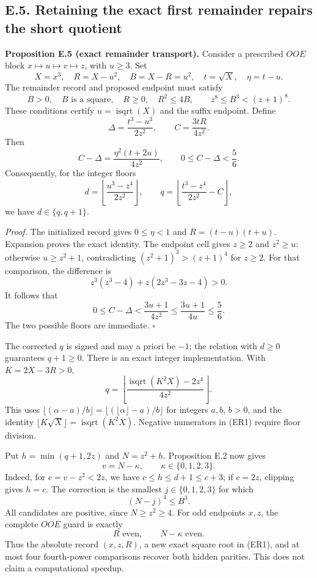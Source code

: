 \documentclass[12pt]{article}
\begin{document}
\subsection{E.5. Retaining the exact first remainder repairs the short
quotient}\label{e.5.-retaining-the-exact-first-remainder-repairs-the-short-quotient}

\textbf{Proposition E.5 (exact remainder transport).} Consider a
prescribed \(OOE\) block \(x\mapsto u\mapsto v\mapsto z\), with
\(u\ge3\). Set \[
X=x^3,\quad R=X-u^2,\quad B=X-R=u^2,\quad t=\sqrt X,\quad\eta=t-u.
\] The remainder record and proposed endpoint must satisfy \[
B>0,\quad B\text{ is a square},\quad R\ge0,\quad R^2\le4B,\qquad
z^8\le B^3<(z+1)^8.
\] These conditions certify \(u=\operatorname{isqrt}(X)\) and the suffix
endpoint. Define \[
\Delta=\frac{t^3-u^3}{2z^2},\qquad C=\frac{3tR}{4z^2}.
\] Then \[
C-\Delta=\frac{\eta^2(t+2u)}{4z^2},\qquad
0\le C-\Delta<\frac56.
\] Consequently, for the integer floors \[
d=\left\lfloor\frac{u^3-z^4}{2z^2}\right\rfloor,\qquad
q=\left\lfloor\frac{t^3-z^4}{2z^2}-C\right\rfloor,
\] we have \(d\in\{q,q+1\}\).

\emph{Proof.} The initialized record gives \(0\le\eta<1\) and
\(R=(t-u)(t+u)\). Expansion proves the exact identity. The endpoint cell
gives \(z\ge2\) and \(z^2\ge u\): otherwise \(u\ge z^2+1\),
contradicting \((z^2+1)^3>(z+1)^4\) for \(z\ge2\). For that comparison,
the difference is \[
z^3(z^3-4)+z(2z^3-3z-4)>0.
\] It follows that \[
0\le C-\Delta<\frac{3u+1}{4z^2}
\le\frac{3u+1}{4u}\le\frac56.
\] The two possible floors are immediate. \(\square\)

The corrected \(q\) is signed and may a priori be \(-1\); the relation
with \(d\ge0\) guarantees \(q+1\ge0\). There is an exact integer
implementation. With \(K=2X-3R>0\), \[
q=\left\lfloor
\frac{\operatorname{isqrt}(K^2X)-2z^4}{4z^2}
\right\rfloor. \tag{ER1}
\] This uses
\(\lfloor(\alpha-a)/b\rfloor=\lfloor(\lfloor\alpha\rfloor-a)/b\rfloor\)
for integers \(a,b\), \(b>0\), and the identity
\(\lfloor K\sqrt X\rfloor=\operatorname{isqrt}(K^2X)\). Negative
numerators in (ER1) require floor division.

Put \(h=\min(q+1,2z)\) and \(N=z^2+h\). Proposition E.2 now gives \[
v=N-\kappa,\qquad\kappa\in\{0,1,2,3\}.
\] Indeed, for \(c=v-z^2<2z\), we have \(c\le h\le d+1\le c+3\); if
\(c=2z\), clipping gives \(h=c\). The correction is the smallest
\(j\in\{0,1,2,3\}\) for which \[
(N-j)^4\le B^3.
\] All candidates are positive, since \(N\ge z^2\ge4\). For odd
endpoints \(x,z\), the complete \(OOE\) guard is exactly \[
R\text{ even},\qquad N-\kappa\text{ even}.
\] Thus the absolute record \((x,z,R)\), a new exact square root in
(ER1), and at most four fourth-power comparisons recover both hidden
parities. This does not claim a computational speedup.
\end{document}
